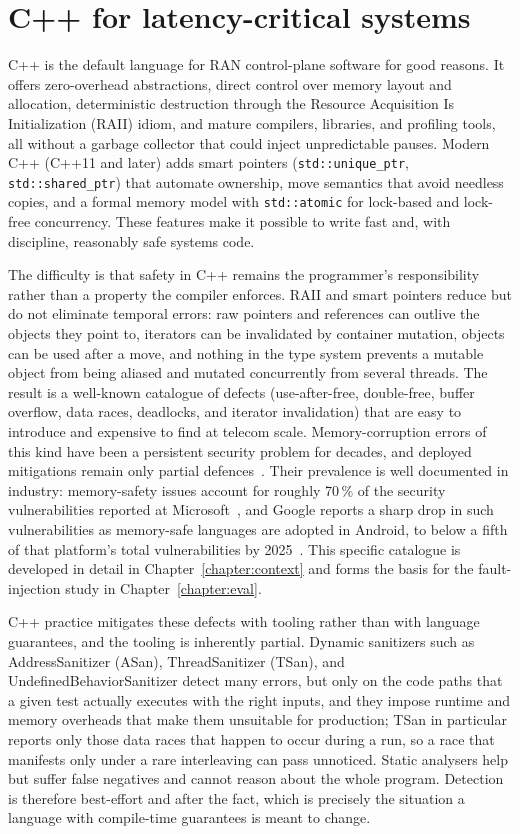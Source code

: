 \documentclass[english,twoside,openright,a4paper,censored,csm,software-track-2020]{HYthesisML}
\begin{document}
\section{C++ for latency-critical systems}\label{sec:cpplatency}
C++ is the default language for RAN control-plane software for good reasons. It offers
zero-overhead abstractions, direct control over memory layout and allocation, deterministic
destruction through the Resource Acquisition Is Initialization (RAII) idiom, and mature
compilers, libraries, and profiling tools, all without a garbage collector that could inject
unpredictable pauses. Modern C++ (C++11 and later) adds smart pointers
(\texttt{std::unique\_ptr}, \texttt{std::shared\_ptr}) that automate ownership, move semantics
that avoid needless copies, and a formal memory model with \texttt{std::atomic} for
lock-based and lock-free concurrency. These features make it possible to write fast and, with
discipline, reasonably safe systems code.

The difficulty is that safety in C++ remains the programmer's responsibility rather than a
property the compiler enforces. RAII and smart pointers reduce but do not eliminate temporal
errors: raw pointers and references can outlive the objects they point to, iterators can be
invalidated by container mutation, objects can be used after a move, and nothing in the type
system prevents a mutable object from being aliased and mutated concurrently from several
threads. The result is a well-known catalogue of defects (use-after-free, double-free,
buffer overflow, data races, deadlocks, and iterator invalidation) that are easy to
introduce and expensive to find at telecom scale. Memory-corruption errors of this kind have
been a persistent security problem for decades, and deployed mitigations remain only partial
defences~\cite{szekeres2013sok}. Their prevalence is well documented in
industry: memory-safety issues account for roughly 70\,\% of the security vulnerabilities
reported at Microsoft~\cite{msrc2019memory}, and Google reports a sharp drop in such
vulnerabilities as memory-safe languages are adopted in Android, to below a fifth of that
platform's total vulnerabilities by
2025~\cite{google2022android,vanderstoep2025android}. This
specific catalogue is developed in detail in Chapter~\ref{chapter:context} and forms the basis
for the fault-injection study in Chapter~\ref{chapter:eval}.

C++ practice mitigates these defects with tooling rather than with language guarantees, and
the tooling is inherently partial. Dynamic sanitizers such as AddressSanitizer (ASan),
ThreadSanitizer (TSan), and UndefinedBehaviorSanitizer detect many errors, but only on the
code paths that a given test actually executes with the right inputs, and they impose runtime
and memory overheads that make them unsuitable for production; TSan in particular reports only
those data races that happen to occur during a run, so a race that manifests only under a rare
interleaving can pass unnoticed. Static analysers help but suffer false negatives and cannot
reason about the whole program. Detection is therefore best-effort and after the fact, which
is precisely the situation a language with compile-time guarantees is meant to change.
\end{document}
